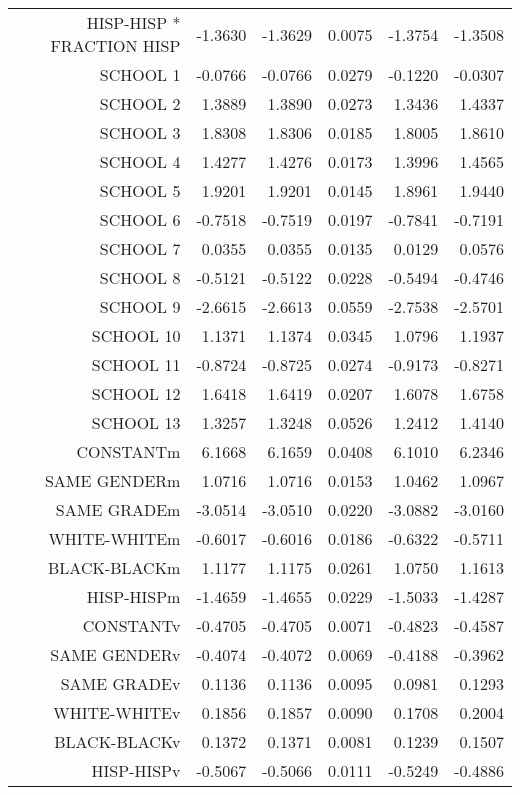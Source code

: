 \begin{table}[ht]
\begin{tabular}{rrrrrr}
  HISP-HISP * FRACTION HISP & -1.3630 & -1.3629 & 0.0075 & -1.3754 & -1.3508 \\ 
  SCHOOL 1 & -0.0766 & -0.0766 & 0.0279 & -0.1220 & -0.0307 \\ 
  SCHOOL 2 & 1.3889 & 1.3890 & 0.0273 & 1.3436 & 1.4337 \\ 
  SCHOOL 3 & 1.8308 & 1.8306 & 0.0185 & 1.8005 & 1.8610 \\ 
  SCHOOL 4 & 1.4277 & 1.4276 & 0.0173 & 1.3996 & 1.4565 \\ 
  SCHOOL 5 & 1.9201 & 1.9201 & 0.0145 & 1.8961 & 1.9440 \\ 
  SCHOOL 6 & -0.7518 & -0.7519 & 0.0197 & -0.7841 & -0.7191 \\ 
  SCHOOL 7 & 0.0355 & 0.0355 & 0.0135 & 0.0129 & 0.0576 \\ 
  SCHOOL 8 & -0.5121 & -0.5122 & 0.0228 & -0.5494 & -0.4746 \\ 
  SCHOOL 9 & -2.6615 & -2.6613 & 0.0559 & -2.7538 & -2.5701 \\ 
  SCHOOL 10 & 1.1371 & 1.1374 & 0.0345 & 1.0796 & 1.1937 \\ 
  SCHOOL 11 & -0.8724 & -0.8725 & 0.0274 & -0.9173 & -0.8271 \\ 
  SCHOOL 12 & 1.6418 & 1.6419 & 0.0207 & 1.6078 & 1.6758 \\ 
  SCHOOL 13 & 1.3257 & 1.3248 & 0.0526 & 1.2412 & 1.4140 \\ 
  CONSTANTm & 6.1668 & 6.1659 & 0.0408 & 6.1010 & 6.2346 \\ 
  SAME GENDERm & 1.0716 & 1.0716 & 0.0153 & 1.0462 & 1.0967 \\ 
  SAME GRADEm & -3.0514 & -3.0510 & 0.0220 & -3.0882 & -3.0160 \\ 
  WHITE-WHITEm & -0.6017 & -0.6016 & 0.0186 & -0.6322 & -0.5711 \\ 
  BLACK-BLACKm & 1.1177 & 1.1175 & 0.0261 & 1.0750 & 1.1613 \\ 
  HISP-HISPm & -1.4659 & -1.4655 & 0.0229 & -1.5033 & -1.4287 \\ 
  CONSTANTv & -0.4705 & -0.4705 & 0.0071 & -0.4823 & -0.4587 \\ 
  SAME GENDERv & -0.4074 & -0.4072 & 0.0069 & -0.4188 & -0.3962 \\ 
  SAME GRADEv & 0.1136 & 0.1136 & 0.0095 & 0.0981 & 0.1293 \\ 
  WHITE-WHITEv & 0.1856 & 0.1857 & 0.0090 & 0.1708 & 0.2004 \\ 
  BLACK-BLACKv & 0.1372 & 0.1371 & 0.0081 & 0.1239 & 0.1507 \\ 
  HISP-HISPv & -0.5067 & -0.5066 & 0.0111 & -0.5249 & -0.4886 \\ 
   \hline
\end{tabular}
\end{table}


